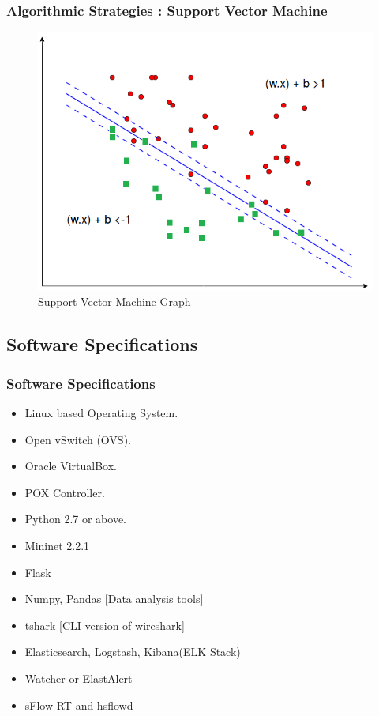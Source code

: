 \documentclass[10pt]{beamer}
\begin{document}
\begin{frame}
\frametitle{Algorithmic Strategies : Support Vector Machine}
\begin{figure}
\includegraphics[scale=0.5]{Support_Vector_Machine.png}
\caption{\footnotesize Support Vector Machine Graph}
\end{figure}
\end{frame}

	

\begin{frame}
\section[]{Software Specifications}
\frametitle{Software Specifications}
\begin{itemize}
\footnotesize
\item
Linux based Operating System.
\item
Open vSwitch (OVS).
\item
Oracle VirtualBox.
\item
POX Controller.
\item
Python 2.7 or above.
\item
Mininet 2.2.1
\item
Flask
\item
Numpy, Pandas [Data analysis tools]
\item
tshark [CLI version of wireshark]
\item
Elasticsearch, Logstash, Kibana(ELK Stack)
\item
Watcher or ElastAlert
\item
sFlow-RT and hsflowd
\end{itemize}
\end{frame}
\end{document}
